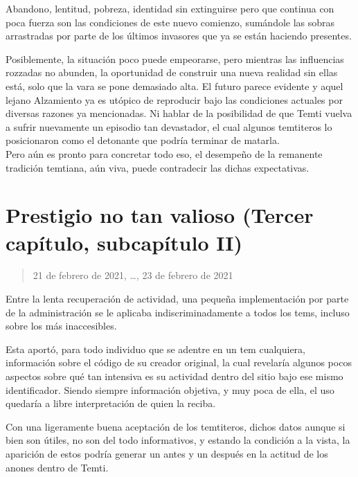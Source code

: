\documentclass[
  spanish,
]{book}
\begin{document}
Abandono, lentitud, pobreza, identidad sin extinguirse pero que continua con poca fuerza son las condiciones de este nuevo comienzo, sumándole las sobras arrastradas por parte de los últimos invasores que ya se están haciendo presentes.

Posiblemente, la situación poco puede empeorarse, pero mientras las influencias rozzadas no abunden, la oportunidad de construir una nueva realidad sin ellas está, solo que la vara se pone demasiado alta. El futuro parece evidente y aquel lejano Alzamiento ya es utópico de reproducir bajo las condiciones actuales por diversas razones ya mencionadas. Ni hablar de la posibilidad de que Temti vuelva a sufrir nuevamente un episodio tan devastador, el cual algunos temtiteros lo posicionaron como el detonante que podría terminar de matarla.\\
Pero aún es pronto para concretar todo eso, el desempeño de la remanente tradición temtiana, aún viva, puede contradecir las dichas expectativas.

\hypertarget{prestigio-no-tan-valioso-tercer-capuxedtulo-subcapuxedtulo-ii}{%
\section{Prestigio no tan valioso (Tercer capítulo, subcapítulo II)}\label{prestigio-no-tan-valioso-tercer-capuxedtulo-subcapuxedtulo-ii}}

\begin{quote}
21 de febrero de 2021, \ldots, 23 de febrero de 2021
\end{quote}

Entre la lenta recuperación de actividad, una pequeña implementación por parte de la administración se le aplicaba indiscriminadamente a todos los tems, incluso sobre los más inaccesibles.

Esta aportó, para todo individuo que se adentre en un tem cualquiera, información sobre el código de su creador original, la cual revelaría algunos pocos aspectos sobre qué tan intensiva es su actividad dentro del sitio bajo ese mismo identificador. Siendo siempre información objetiva, y muy poca de ella, el uso quedaría a libre interpretación de quien la reciba.

Con una ligeramente buena aceptación de los temtiteros, dichos datos aunque si bien son útiles, no son del todo informativos, y estando la condición a la vista, la aparición de estos podría generar un antes y un después en la actitud de los anones dentro de Temti.
\end{document}
